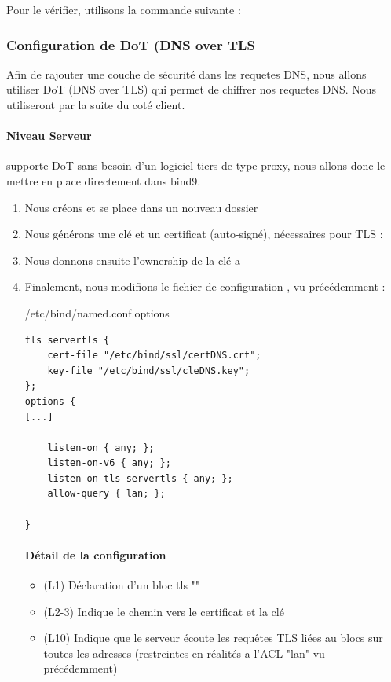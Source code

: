 \documentclass{article}
\begin{document}
Pour le vérifier, utilisons la commande suivante :

\subsubsection{Configuration de DoT (DNS over TLS}
Afin de rajouter une couche de sécurité dans les requetes DNS, nous allons utiliser DoT (DNS over TLS) qui permet de chiffrer nos requetes DNS. Nous utiliseront par la suite  du coté client.

\paragraph{Niveau Serveur\\}
 supporte DoT sans besoin d'un logiciel tiers de type proxy, nous allons donc le mettre en place directement dans bind9.
\begin{enumerate}
	\item Nous créons et se place dans un nouveau dossier 
	\item Nous générons une clé et un certificat (auto-signé), nécessaires pour TLS :
	\item Nous donnons ensuite l'ownership de la clé a 
	\item Finalement, nous modifions le fichier de configuration , vu précédemment : 
	\begin{configbox}{/etc/bind/named.conf.options}
		\begin{lstlisting}
tls servertls {
	cert-file "/etc/bind/ssl/certDNS.crt";
	key-file "/etc/bind/ssl/cleDNS.key";
};
options {
[...]

	listen-on { any; };
	listen-on-v6 { any; };
	listen-on tls servertls { any; };
	allow-query { lan; };

}
		\end{lstlisting}
	\end{configbox}
	\paragraph{Détail de la configuration}
	\begin{itemize}
		\item (L1) Déclaration d'un bloc tls ""
		\item (L2-3) Indique le chemin vers le certificat et la clé
		\item (L10) Indique que le serveur écoute les requêtes TLS liées au blocs  sur toutes les adresses (restreintes en réalités a l'ACL "lan" vu précédemment)
	\end{itemize}
\end{enumerate}
\end{document}
